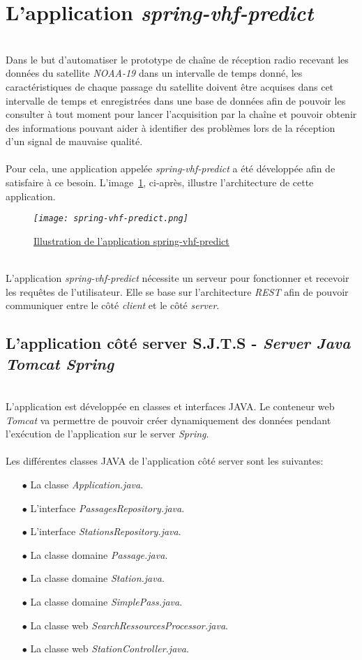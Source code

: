 \documentclass[12pt,fleqn]{book} %
\begin{document}
\section{L'application \emph{spring-vhf-predict}}
~\\\indent Dans le but d'automatiser le prototype de chaîne de réception radio recevant les données du satellite \emph{NOAA-19} dans un intervalle de temps donné, les caractéristiques de chaque passage du satellite doivent être acquises dans cet intervalle de temps et enregistrées dans une base de données afin de pouvoir les consulter à tout moment pour lancer l'acquisition par la chaîne et pouvoir obtenir des informations pouvant aider à identifier des problèmes lors de la réception d'un signal de mauvaise qualité.
~\\\\Pour cela, une application appelée \emph{spring-vhf-predict} a été développée afin de satisfaire à ce besoin. L'image~\underline{\color{blue}\ref{archi-spring}}, ci-après, illustre l'architecture de cette application.
~\\
\begin{figure}[H]
	\centering
	\itshape
	\texttt{[image: spring-vhf-predict.png]}
	\caption{\label{archi-spring} \underline{Illustration de l'application spring-vhf-predict}}
\end{figure}
~\\\indent L'application \emph{spring-vhf-predict} nécessite un serveur pour fonctionner et recevoir les requêtes de l'utilisateur. Elle se base sur l'architecture \emph{REST} afin de pouvoir communiquer entre le côté \emph{client} et le côté \emph{server}.
\subsection{L'application côté server S.J.T.S - \emph{Server Java Tomcat Spring}}
~\\\indent L'application est développée en classes et interfaces JAVA. Le conteneur web \emph{Tomcat} va permettre de pouvoir créer dynamiquement des données pendant l'exécution de l'application sur le server \emph{Spring}. 
~\\\\Les différentes classes JAVA de l'application côté server sont les suivantes:
~\\
\begin{itemize}
 \item[$\bullet$] La classe \emph{Application.java}.
 \item[$\bullet$] L'interface \emph{PassagesRepository.java}.
 \item[$\bullet$] L'interface \emph{StationsRepository.java}.
 \item[$\bullet$] La classe domaine \emph{Passage.java}.
 \item[$\bullet$] La classe domaine \emph{Station.java}.
 \item[$\bullet$] La classe domaine \emph{SimplePass.java}.
 \item[$\bullet$] La classe web \emph{SearchRessourcesProcessor.java}.
 \item[$\bullet$] La classe web \emph{StationController.java}.
\end{itemize}
\end{document}
